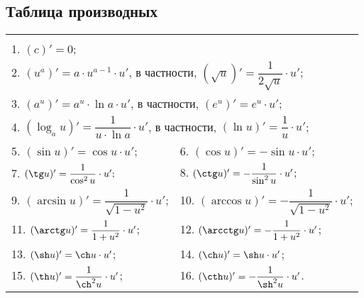 \subsection{Таблица производных}
\begin{table}[h]
  \centering
  \begin{tabular}{|ll|}
    \hline
    \vspace{-6.5pt} & \\
    \multicolumn{2}{|l|}{1. $(c)'=0$;}\\
    \multicolumn{2}{|l|}{2. $\left(u^a\right)'=a \cdot u^{a - 1}\cdot u'$, в частности, $(\sqrt{u})'=\dfrac{1}{2\sqrt{u}}\cdot u'$;}\\[1ex]
    \multicolumn{2}{|l|}{3. $\left(a^u\right)'=a^u\cdot \ln a \cdot u'$, в частности, $(e^u)'=e^u\cdot u'$;}\\
    \multicolumn{2}{|l|}{4. $\left(\log_a u\right)' = \dfrac{1}{u \cdot \ln a}\cdot u'$, в частности, $(\ln u)' = \dfrac{1}{u}\cdot u'$;}\\[2ex]
    5. $(\sin u)' = \cos u \cdot u';$ & 6. $(\cos u)' = -\sin u \cdot u'$;\\[1ex]
    7. $(\tg u)' = \dfrac{1}{\cos^2 u}\cdot u';$ & 8. $(\ctg u)' = -\dfrac{1}{\sin^2 u} \cdot u'$;\\[2ex]
    9. $(\arcsin u)' = \dfrac{1}{\sqrt{1 - u^2}}\cdot u'$; & 10. $(\arccos u)' = -\dfrac{1}{\sqrt{1 - u^2}}\cdot u'$;\\[2ex]
    11. $(\arctg u)' = \dfrac{1}{1+u^2}\cdot u'$; & 12. $(\arcctg u)' = -\dfrac{1}{1+u^2}\cdot u'$;\\[2ex]
    13. $(\sh u)' = \ch u \cdot u'$; & 14. $(\ch u)' = \sh u \cdot u'$;\\[1ex]
    15. $(\th u)' = \dfrac{1}{\ch^2 u} \cdot u'$; & 16. $(\cth u)' = -\dfrac{1}{\sh^2 u} \cdot u'$.\\[2ex]
    \hline
  \end{tabular}
\end{table}


